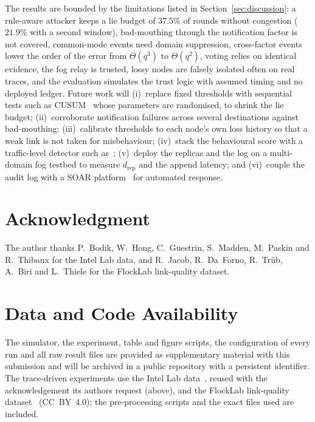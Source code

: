 The results are bounded by the limitations listed in
Section~\ref{sec:discussion}: a rule-aware attacker keeps a lie budget
of $37.5\%$ of rounds without congestion ($21.9\%$ with a second
window), bad-mouthing through the notification factor is not covered,
common-mode events need domain suppression, cross-factor events lower
the order of the error from $\Theta(q^{3})$ to $\Theta(q^{2})$,
voting relies on identical evidence, the fog relay is trusted, lossy
nodes are falsely isolated often on real traces, and the evaluation
simulates the trust logic with assumed timing and no deployed ledger.  Future work will
(i)~replace fixed thresholds with sequential tests such as
CUSUM~\cite{page1954continuous} whose parameters are randomised, to
shrink the lie budget; (ii)~corroborate notification failures across
several destinations against bad-mouthing; (iii)~calibrate thresholds to each node's own loss history so that
a weak link is not taken for misbehaviour; (iv)~stack the behavioural
score with a traffic-level detector such
as~\cite{meidan2018nbaiot}; (v)~deploy the replicas and the log on a
multi-domain fog testbed to measure $d_{\mathrm{rep}}$ and the append
latency; and (vi)~couple the audit log with a SOAR
platform~\cite{empl2022soar4iot} for automated response.

\section*{Acknowledgment}
The author thanks P.~Bodik, W.~Hong, C.~Guestrin, S.~Madden,
M.~Paskin and R.~Thibaux for the Intel Lab data, and R.~Jacob,
R.~Da~Forno, R.~Tr{\"u}b, A.~Biri and L.~Thiele for the FlockLab
link-quality dataset.

\section*{Data and Code Availability}
The simulator, the experiment, table and figure scripts, the
configuration of every run and all raw result files are provided as
supplementary material with this submission and will be archived in a
public repository with a persistent identifier.  The trace-driven
experiments use the Intel Lab data~\cite{bodik2004intel}, reused with
the acknowledgement its authors request (above), and the FlockLab link-quality
dataset~\cite{jacob2019flocklab} (CC~BY~4.0); the pre-processing scripts
and the exact files used are included.
